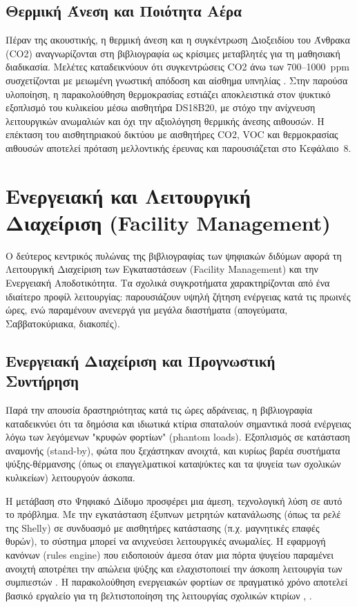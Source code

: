 \subsection{Θερμική Άνεση και Ποιότητα Αέρα}
Πέραν της ακουστικής, η θερμική άνεση και η συγκέντρωση Διοξειδίου του Άνθρακα (\textlatin{CO2}) αναγνωρίζονται στη βιβλιογραφία ως κρίσιμες μεταβλητές για τη μαθησιακή διαδικασία. Μελέτες καταδεικνύουν ότι συγκεντρώσεις \textlatin{CO2} άνω των 700--1000~\textlatin{ppm} συσχετίζονται με μειωμένη γνωστική απόδοση και αίσθημα υπνηλίας \cite{Allen2016}. Στην παρούσα υλοποίηση, η παρακολούθηση θερμοκρασίας εστιάζει αποκλειστικά στον ψυκτικό εξοπλισμό του κυλικείου μέσω αισθητήρα \textlatin{DS18B20}, με στόχο την ανίχνευση λειτουργικών ανωμαλιών και όχι την αξιολόγηση θερμικής άνεσης αιθουσών. Η επέκταση του αισθητηριακού δικτύου με αισθητήρες \textlatin{CO2}, \textlatin{VOC} και θερμοκρασίας αιθουσών αποτελεί πρόταση μελλοντικής έρευνας και παρουσιάζεται στο Κεφάλαιο~8.

\section{Ενεργειακή και Λειτουργική Διαχείριση (\textlatin{Facility Management})}
Ο δεύτερος κεντρικός πυλώνας της βιβλιογραφίας των ψηφιακών διδύμων αφορά τη Λειτουργική Διαχείριση των Εγκαταστάσεων (\textlatin{Facility Management}) και την Ενεργειακή Αποδοτικότητα. Τα σχολικά συγκροτήματα χαρακτηρίζονται από ένα ιδιαίτερο προφίλ λειτουργίας: παρουσιάζουν υψηλή ζήτηση ενέργειας κατά τις πρωινές ώρες, ενώ παραμένουν ανενεργά για μεγάλα διαστήματα (απογεύματα, Σαββατοκύριακα, διακοπές).

\subsection{Ενεργειακή Διαχείριση και Προγνωστική Συντήρηση}
Παρά την απουσία δραστηριότητας κατά τις ώρες αδράνειας, η βιβλιογραφία καταδεικνύει ότι τα δημόσια και ιδιωτικά κτίρια σπαταλούν σημαντικά ποσά ενέργειας λόγω των λεγόμενων "κρυφών φορτίων" (\textlatin{phantom loads}). Εξοπλισμός σε κατάσταση αναμονής (\textlatin{stand-by}), φώτα που ξεχάστηκαν ανοιχτά, και κυρίως βαρέα συστήματα ψύξης-θέρμανσης (όπως οι επαγγελματικοί καταψύκτες και τα ψυγεία των σχολικών κυλικείων) λειτουργούν άσκοπα.

Η μετάβαση στο Ψηφιακό Δίδυμο προσφέρει μια άμεση, τεχνολογική λύση σε αυτό το πρόβλημα. Με την εγκατάσταση έξυπνων μετρητών κατανάλωσης (όπως τα ρελέ της \textlatin{Shelly}) σε συνδυασμό με αισθητήρες κατάστασης (π.χ. μαγνητικές επαφές θυρών), το σύστημα μπορεί να ανιχνεύσει λειτουργικές ανωμαλίες. Η εφαρμογή κανόνων (\textlatin{rules engine}) που ειδοποιούν άμεσα όταν μια πόρτα ψυγείου παραμένει ανοιχτή αποτρέπει την απώλεια ψύξης και ελαχιστοποιεί την άσκοπη λειτουργία των συμπιεστών \cite{Apostolopoulos2022}. Η παρακολούθηση ενεργειακών φορτίων σε πραγματικό χρόνο αποτελεί βασικό εργαλείο για τη βελτιστοποίηση της λειτουργίας σχολικών κτιρίων \cite{Fokaides2020}, \cite{Markoska2019}.

